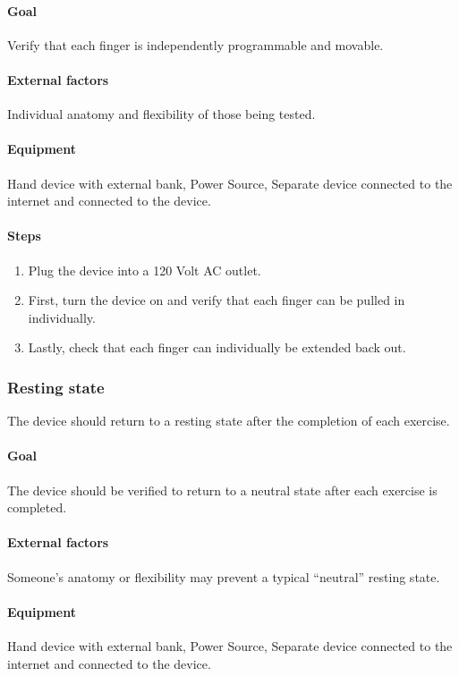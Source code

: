\documentclass{article}
\begin{document}
\paragraph{Goal} Verify that each finger is independently programmable and movable.

\paragraph{External factors} Individual anatomy and flexibility of those being tested.

\paragraph{Equipment} Hand device with external bank, Power Source, Separate device connected to the internet and connected to the device.

\paragraph{Steps}
\begin{enumerate}
\item Plug the device into a 120 Volt AC outlet.
\item First, turn the device on and verify that each finger can be pulled in individually.
\item Lastly, check that each finger can individually be extended back out.
\end{enumerate}

\subsubsection{Resting state}
The device should return to a resting state after the completion of each exercise.

\paragraph{Goal} The device should be verified to return to a neutral state after each exercise is completed.

\paragraph{External factors} Someone’s anatomy or flexibility may prevent a typical “neutral” resting state.

\paragraph{Equipment} Hand device with external bank, Power Source, Separate device connected to the internet and connected to the device.
\end{document}
